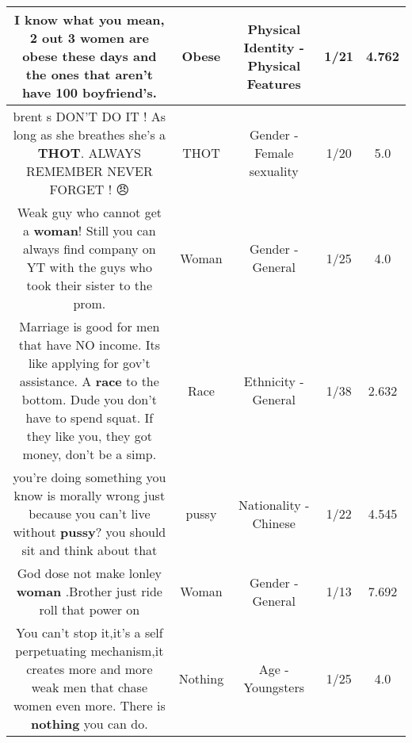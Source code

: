 \documentclass[11pt]{article}
\newlength\mylength
\begin{document}
\begin{center}
\begin{longtable}{|C{.65\mylength}|C{.30\mylength}|C{.12\mylength}|C{.12\mylength}|C{.12\mylength}|}
  \small I know what you mean, 2 out 3 women are \textbf{obese} these days and the ones that aren't have 100 boyfriend's.\normalsize   & Obese & Physical Identity - Physical Features & 1/21 & 4.762 \\  \hline
  \small brent s DON'T DO IT ! As long as she breathes she's a \textbf{THOT}. ALWAYS REMEMBER NEVER FORGET ! 😠\normalsize   & THOT & Gender - Female sexuality & 1/20 & 5.0 \\  \hline
  \small Weak guy who cannot get a \textbf{woman}! Still you can always find company on YT with the guys who took their sister to the prom.\normalsize   & Woman & Gender - General & 1/25 & 4.0 \\  \hline
  \small Marriage is good for men that have NO income. Its like applying for gov't assistance. A \textbf{race} to the bottom. Dude you don't have to spend squat. If they like you, they got money, don't be a simp.\normalsize   & Race & Ethnicity - General & 1/38 & 2.632 \\  \hline
  \small you're doing something you know is morally wrong just because you can't live without \textbf{pussy}? you should sit and think about that\normalsize   & pussy & Nationality - Chinese & 1/22 & 4.545 \\  \hline
  \small God dose not make lonley \textbf{woman} .Brother just ride roll that power on\normalsize   & Woman & Gender - General & 1/13 & 7.692 \\  \hline
  \small You can't stop it,it's a self perpetuating mechanism,it creates more and more weak men that chase women even more. There is \textbf{nothing} you can do.\normalsize   & Nothing & Age - Youngsters & 1/25 & 4.0 \\  \hline

\end{longtable}
\end{center}
\end{document}

